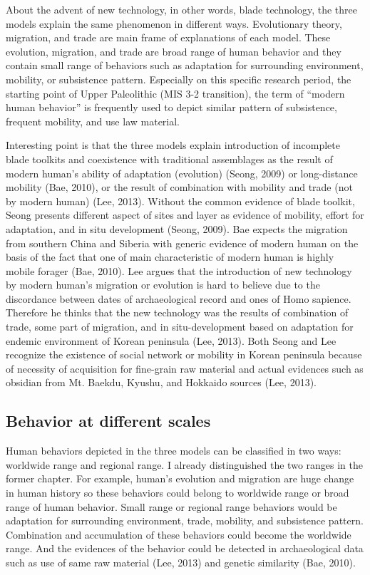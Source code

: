 \documentclass[american,man]{apa6}
\begin{document}
About the advent of new technology, in other words, blade technology,
the three models explain the same phenomenon in different ways.
Evolutionary theory, migration, and trade are main frame of explanations
of each model. These evolution, migration, and trade are broad range of
human behavior and they contain small range of behaviors such as
adaptation for surrounding environment, mobility, or subsistence
pattern. Especially on this specific research period, the starting point
of Upper Paleolithic (MIS 3-2 transition), the term of \enquote{modern
human behavior} is frequently used to depict similar pattern of
subsistence, frequent mobility, and use law material.

Interesting point is that the three models explain introduction of
incomplete blade toolkits and coexistence with traditional assemblages
as the result of modern human's ability of adaptation (evolution)
(Seong, 2009) or long-distance mobility (Bae, 2010), or the result of
combination with mobility and trade (not by modern human) (Lee, 2013).
Without the common evidence of blade toolkit, Seong presents different
aspect of sites and layer as evidence of mobility, effort for
adaptation, and in situ development (Seong, 2009). Bae expects the
migration from southern China and Siberia with generic evidence of
modern human on the basis of the fact that one of main characteristic of
modern human is highly mobile forager (Bae, 2010). Lee argues that the
introduction of new technology by modern human's migration or evolution
is hard to believe due to the discordance between dates of
archaeological record and ones of Homo sapience. Therefore he thinks
that the new technology was the results of combination of trade, some
part of migration, and in situ-development based on adaptation for
endemic environment of Korean peninsula (Lee, 2013). Both Seong and Lee
recognize the existence of social network or mobility in Korean
peninsula because of necessity of acquisition for fine-grain raw
material and actual evidences such as obsidian from Mt. Baekdu, Kyushu,
and Hokkaido sources (Lee, 2013).

\subsection{Behavior at different
scales}\label{behavior-at-different-scales}

Human behaviors depicted in the three models can be classified in two
ways: worldwide range and regional range. I already distinguished the
two ranges in the former chapter. For example, human's evolution and
migration are huge change in human history so these behaviors could
belong to worldwide range or broad range of human behavior. Small range
or regional range behaviors would be adaptation for surrounding
environment, trade, mobility, and subsistence pattern. Combination and
accumulation of these behaviors could become the worldwide range. And
the evidences of the behavior could be detected in archaeological data
such as use of same raw material (Lee, 2013) and genetic similarity
(Bae, 2010).
\end{document}
